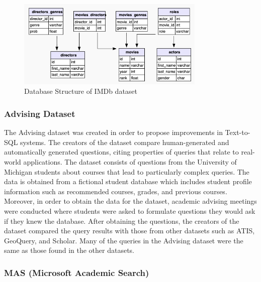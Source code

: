 \begin{figure}[htb]
    \centering
    \includegraphics[width=0.8\textwidth]{pics/db/IMDb.png}
    \caption{Database Structure of IMDb dataset\cite{dahl-etal-1994-expanding}}
    \label{fig:IMDb}
\end{figure}


\subsubsection{Advising Dataset}

The Advising dataset\cite{finegan-dollak-etal-2018-improving} was created in order to propose improvements in Text-to-SQL systems. The creators of the dataset compare human-generated and automatically generated questions, citing properties of queries that relate to real-world applications. The dataset consists of questions from the University of Michigan students about courses that lead to particularly complex queries. The data is obtained from a fictional student database which includes student profile information such as recommended courses, grades, and previous courses. Moreover, in order to obtain the data for the dataset, academic advising meetings were conducted where students were asked to formulate questions they would ask if they knew the database. After obtaining the questions, the creators of the dataset compared the query results with those from other datasets such as ATIS, GeoQuery, and Scholar. Many of the queries in the Advising dataset were the same as those found in the other datasets.


\subsubsection{MAS (Microsoft Academic Search)}

